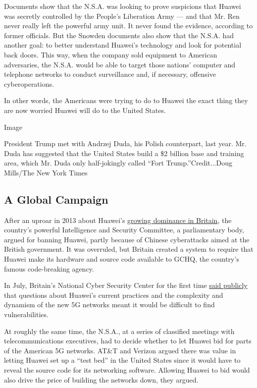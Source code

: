 Documents show that the N.S.A. was looking to prove suspicions that
Huawei was secretly controlled by the People's Liberation Army --- and
that Mr. Ren never really left the powerful army unit. It never found
the evidence, according to former officials. But the Snowden documents
also show that the N.S.A. had another goal: to better understand
Huawei's technology and look for potential back doors. This way, when
the company sold equipment to American adversaries, the N.S.A. would be
able to target those nations' computer and telephone networks to conduct
surveillance and, if necessary, offensive cyberoperations.

In other words, the Americans were trying to do to Huawei the exact
thing they are now worried Huawei will do to the United States.

Image

President Trump met with Andrzej Duda, his Polish counterpart, last
year. Mr. Duda has suggested that the United States build a \$2 billion
base and training area, which Mr. Duda only half-jokingly called ``Fort
Trump.''Credit...Doug Mills/The New York Times

\hypertarget{a-global-campaign}{%
\subsection{A Global Campaign}\label{a-global-campaign}}

After an uproar in 2013 about Huawei's
\href{https://www.nytimes.com/2019/01/22/technology/huawei-europe-china.html}{growing
dominance in Britain}, the country's powerful Intelligence and Security
Committee, a parliamentary body, argued for banning Huawei, partly
because of Chinese cyberattacks aimed at the British government. It was
overruled, but Britain created a system to require that Huawei make its
hardware and source code available to GCHQ, the country's famous
code-breaking agency.

In July, Britain's National Cyber Security Center for the first time
\href{https://assets.publishing.service.gov.uk/government/uploads/system/uploads/attachment_data/file/727415/20180717_HCSEC_Oversight_Board_Report_2018_-_FINAL.pdf}{said
publicly} that questions about Huawei's current practices and the
complexity and dynamism of the new 5G networks meant it would be
difficult to find vulnerabilities.

At roughly the same time, the N.S.A., at a series of classified meetings
with telecommunications executives, had to decide whether to let Huawei
bid for parts of the American 5G networks. AT\&T and Verizon argued
there was value in letting Huawei set up a ``test bed'' in the United
States since it would have to reveal the source code for its networking
software. Allowing Huawei to bid would also drive the price of building
the networks down, they argued.

